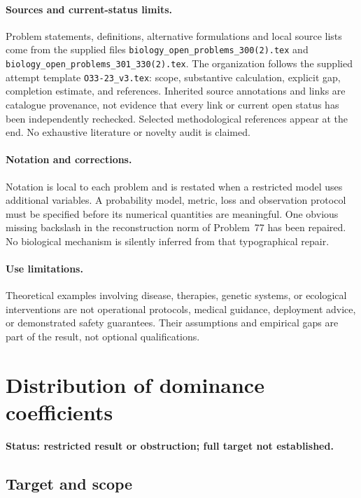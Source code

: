\documentclass[11pt]{article}
\begin{document}
\paragraph{Sources and current-status limits.}
Problem statements, definitions, alternative formulations and local source lists
come from the supplied files
\texttt{biology\_open\_problems\_300(2).tex} and
\texttt{biology\_open\_problems\_301\_330(2).tex}.
The organization follows the supplied attempt template
\texttt{O33-23\_v3.tex}: scope, substantive calculation, explicit gap,
completion estimate, and references. Inherited source annotations and links are
catalogue provenance, not evidence that every link or current open status has
been independently rechecked. Selected methodological references appear at the
end. No exhaustive literature or novelty audit is claimed.

\paragraph{Notation and corrections.}
Notation is local to each problem and is restated when a restricted model uses
additional variables. A probability model, metric, loss and observation protocol
must be specified before its numerical quantities are meaningful. One obvious
missing backslash in the reconstruction norm of Problem~77 has been repaired.
No biological mechanism is silently inferred from that typographical repair.

\paragraph{Use limitations.}
Theoretical examples involving disease, therapies, genetic systems, or ecological
interventions are not operational protocols, medical guidance, deployment advice,
or demonstrated safety guarantees. Their assumptions and empirical gaps are part
of the result, not optional qualifications.


\section*{Distribution of dominance coefficients}
\label{prob:167}
\noindent\textbf{Status: restricted result or obstruction; full target not established.}
\subsection{Target and scope}
\end{document}
